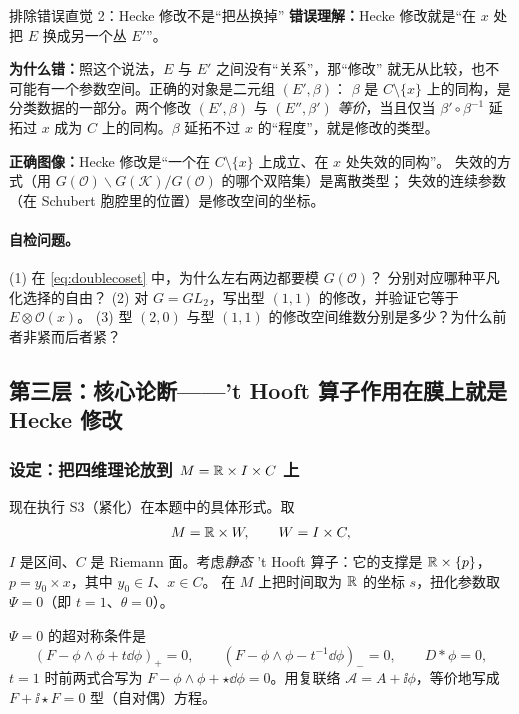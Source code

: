 \begin{kcard}{排除错误直觉 2：Hecke 修改不是“把丛换掉”}
\textbf{错误理解：}Hecke 修改就是“在 $x$ 处把 $E$ 换成另一个丛 $E'$”。

\textbf{为什么错：}照这个说法，$E$ 与 $E'$ 之间没有“关系”，那“修改”
就无从比较，也不可能有一个参数空间。正确的对象是二元组 $(E',\beta)$：
$\beta$ 是 $C\setminus\{x\}$ 上的同构，是分类数据的一部分。两个修改 $(E',\beta)$ 与
$(E'',\beta')$ \emph{等价}，当且仅当 $\beta'\circ\beta^{-1}$ 延拓过 $x$ 成为
$C$ 上的同构。$\beta$ 延拓不过 $x$ 的“程度”，就是修改的类型。\pA{}

\textbf{正确图像：}Hecke 修改是“一个在 $C\setminus\{x\}$ 上成立、在 $x$ 处失效的同构”。
失效的方式（用 $G(\mathcal{O})\backslash G(\mathcal{K})/G(\mathcal{O})$ 的哪个双陪集）是离散类型；
失效的连续参数（在 Schubert 胞腔里的位置）是修改空间的坐标。
\end{kcard}

\paragraph{自检问题。}
(1) 在 \eqref{eq:doublecoset} 中，为什么左右两边都要模 $G(\mathcal{O})$？
分别对应哪种平凡化选择的自由？
(2) 对 $G=GL_2$，写出型 $(1,1)$ 的修改，并验证它等于 $E\otimes\mathcal{O}(x)$。
(3) 型 $(2,0)$ 与型 $(1,1)$ 的修改空间维数分别是多少？为什么前者非紧而后者紧？


\subsection{第三层：核心论断——\texorpdfstring{'t Hooft}{'t Hooft} 算子作用在膜上就是 Hecke 修改}
\label{sec:flesh-hecke-claim}

\subsubsection{设定：把四维理论放到 $M=\mathbb{R}\times I\times C$ 上}

现在执行 S3（紧化）在本题中的具体形式。取
\begin{equation}
M=\mathbb{R}\times W,\qquad W=I\times C,
\label{eq:Msetup}
\end{equation}
$I$ 是区间、$C$ 是 Riemann 面。考虑\emph{静态} 't Hooft{} 算子：它的支撑是
$\mathbb{R}\times\{p\}$，$p=y_0\times x$，其中 $y_0\in I$、$x\in C$。
在 $M$ 上把时间取为 $\mathbb{R}$ 的坐标 $s$，扭化参数取 $\Psi=0$（即 $t=1$、$\theta=0$）。\pA{}

$\Psi=0$ 的超对称条件是
\begin{equation}
(F-\phi\wedge\phi+t\dd\phi)_+=0,\qquad
(F-\phi\wedge\phi-t^{-1}\dd\phi)_-=0,\qquad
D{*}\phi=0,
\label{eq:bps}
\end{equation}
$t=1$ 时前两式合写为 $F-\phi\wedge\phi+\star\dd\phi=0$。用复联络
$\mathcal{A}=A+\ii\phi$，等价地写成 $F+\ii\star F=0$ 型（自对偶）方程。\pA{}

